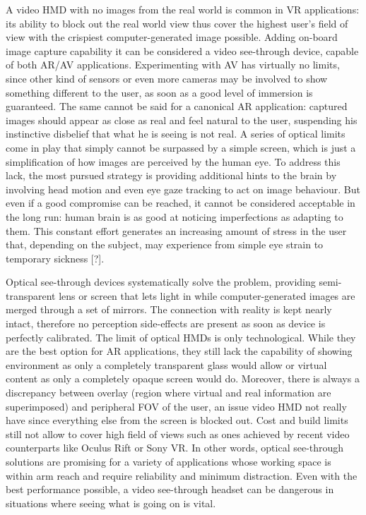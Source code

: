 A video HMD with no images from the real world is common in VR applications: its ability to block out the real world view thus cover the highest user’s field of view with the crispiest computer-generated image possible. Adding on-board image capture capability it can be considered a video see-through device, capable of both AR/AV applications. Experimenting with AV has virtually no limits, since other kind of sensors or even more cameras may be involved to show something different to the user, as soon as a good level of immersion is guaranteed. The same cannot be said for a canonical AR application: captured images should appear as close as real and feel natural to the user, suspending his instinctive disbelief that what he is seeing is not real. A series of optical limits come in play that simply cannot be surpassed by a simple screen, which is just a simplification of how images are perceived by the human eye. To address this lack, the most pursued strategy is providing additional hints to the brain by involving head motion and even eye gaze tracking to act on image behaviour. But even if a good compromise can be reached, it cannot be considered acceptable in the long run: human brain is as good at noticing imperfections as adapting to them. This constant effort generates an increasing amount of stress in the user that, depending on the subject, may experience from simple eye strain to temporary sickness [?].

Optical see-through devices systematically solve the problem, providing semi-transparent lens or screen that lets light in while computer-generated images are merged through a set of mirrors. The connection with reality is kept nearly intact, therefore no perception side-effects are present as soon as device is perfectly calibrated. The limit of optical HMDs is only technological. While they are the best option for AR applications, they still lack the capability of showing environment as only a completely transparent glass would allow or virtual content as only a completely opaque screen would do. Moreover, there is always a discrepancy between overlay (region where virtual and real information are superimposed) and peripheral FOV of the user, an issue video HMD not really have since everything else from the screen is blocked out. Cost and build limits still not allow to cover high field of views such as ones achieved by recent video counterparts like Oculus Rift or Sony VR. In other words, optical see-through solutions are promising for a variety of applications whose working space is within arm reach and require reliability and minimum distraction. Even with the best performance possible, a video see-through headset can be dangerous in situations where seeing what is going on is vital.

